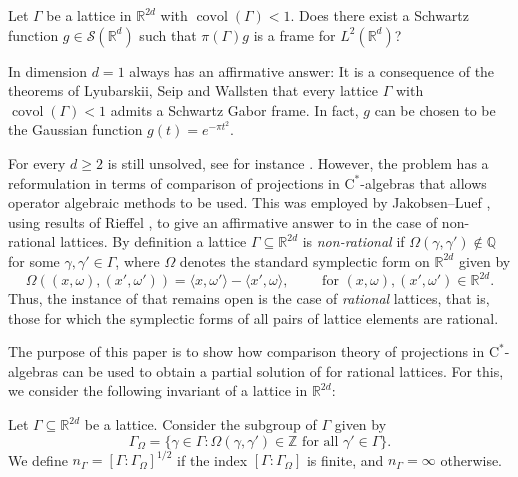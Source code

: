 \documentclass[reqno, a4paper]{amsart}
\numberwithin{equation}{section}
\newcommand{\Z}{\mathbb{Z}}   %
\newcommand{\Q}{\mathbb{Q}}   %
\newcommand{\R}{\mathbb{R}}   %
\newcommand{\ca}{$\mathrm{C}^*$-algebra}
\DeclareMathOperator{\covol}{covol}
\def\subgroup#1{{#1}_\Omega}
\begin{document}
\begin{problem}
\label{prob:balian-low-converse}
Let $\Gamma$ be a lattice in $\R^{2d}$ with $\covol(\Gamma) < 1$. 
Does there exist a Schwartz function $g \in \mathcal{S}(\R^d)$ such that $\pi(\Gamma)g$ is a frame for $L^2(\R^d)$?
\end{problem}

In dimension $d=1$  always has an affirmative answer: It is a consequence of the theorems of Lyubarskii, Seip and Wallsten \cite{se92,sewa92,ly92} that every lattice $\Gamma$ with $\covol(\Gamma) < 1$ admits a Schwartz Gabor frame. In fact, $g$ can be chosen to be the Gaussian function $g(t) = e^{-\pi t^2}$.

For every $d \geq 2$  is still unsolved, see for instance \cite[p.\ 225, Remarks~2]{gr11}. 
However, the problem has a reformulation in terms of comparison of projections in \ca{s} \cite{lu09,lu11,beenva22} that allows operator algebraic methods to be used. This was employed by Jakobsen--Luef \cite[Theorem~5.4]{jalu20}, using results of Rieffel \cite{ri88}, to give an affirmative answer to  in the case of non-rational lattices. 
By definition a lattice $\Gamma \subseteq \R^{2d}$ is \emph{non-rational} if $\Omega(\gamma,\gamma') \notin \Q$ for some $\gamma,\gamma' \in \Gamma$, where $\Omega$ denotes the standard symplectic form on $\R^{2d}$ given by
\begin{equation}
\label{eq:symplectic-form}
\Omega((x,\omega),(x',\omega')) = \langle x, \omega' \rangle - \langle x', \omega \rangle, \qquad \text{ for } (x,\omega),(x',\omega') \in \R^{2d}. 
\end{equation}
Thus, the instance of  that remains open is the case of \emph{rational} lattices, that is, those for which the symplectic forms of all pairs of lattice elements are rational.

The purpose of this paper is to show how comparison theory of projections in \ca{s} can be used to obtain a partial solution of  for rational lattices.
For this, we consider the following invariant of a lattice in $\R^{2d}$:

\begin{definition}
\label{dfn:nGamma}
Let $\Gamma \subseteq \R^{2d}$ be a lattice.
Consider the subgroup of $\Gamma$ given by
\begin{equation}
\label{eq:subgroup}
\subgroup{\Gamma} 
= \big\{ \gamma \in \Gamma : \Omega(\gamma,\gamma') \in \Z \text{ for all } \gamma' \in \Gamma \big\}.
\end{equation}
We define $n_\Gamma = [\Gamma : \subgroup{\Gamma}]^{1/2}$ if the index $[\Gamma : \subgroup{\Gamma}]$ is finite, and $n_\Gamma = \infty$ otherwise.
\end{definition}
\end{document}
